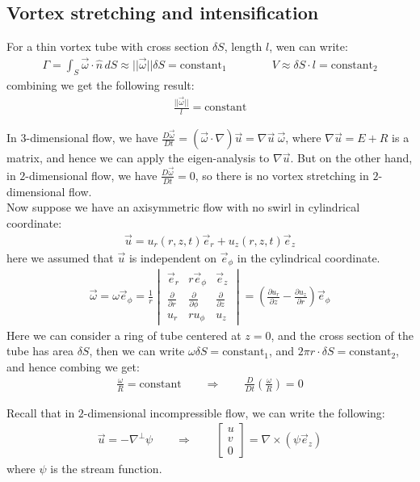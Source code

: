 \documentclass[11pt]{book}
\theoremstyle{break}
\theoremstyle{break}
\newcommand{\pd}{\partial}
\newcommand{\vmat}[1]{\begin{vmatrix} #1 \end{vmatrix}}
\newcommand{\bmat}[1]{\begin{bmatrix} #1 \end{bmatrix}}
\begin{document}
\subsection*{Vortex stretching and intensification}
For a thin vortex tube with cross section $\delta S$, length $l$, wen can write:
\begin{align*}
\Gamma = \int_S \vec{\omega}\cdot \hat{n}\, dS \approx ||\vec{\omega }|| \delta S = \text{constant}_1 \qquad \qquad V \approx \delta S \cdot l = \text{constant}_2
\end{align*}
combining we get the following result:
\begin{align*}
\frac{||\vec{\omega}||}{l} = \text{constant}
\end{align*}

In $3$-dimensional flow, we have $\frac{D\vec{\omega}}{Dt} = (\vec{\omega}\cdot \nabla) \vec{u} = \nabla \vec{u} \ \vec{\omega}$, where $\nabla \vec{u} = E+R$ is a matrix, and hence we can apply the eigen-analysis to $\nabla \vec{u}$. But on the other hand, in $2$-dimensional flow, we have $\frac{D\vec{\omega}}{Dt} = 0$, so there is no vortex stretching in $2$-dimensional flow. \\

Now suppose we have an axisymmetric flow with no swirl in cylindrical coordinate:
\begin{align*}
\vec{u} = u_r(r,z,t) \vec{e}_r + u_z(r, z,t)\vec{e}_z
\end{align*}
here we assumed that $\vec{u}$ is independent on $\vec{e}_\phi$ in the cylindrical coordinate.
\begin{align*}
\vec{\omega} = \omega \vec{e}_{\phi} = \frac{1}{r}\vmat{\vec{e}_r & r \vec{e}_{\phi} & \vec{e}_z \\ \frac{\partial}{\partial r} & \frac{\pd}{\pd \phi}& \frac{\pd }{\pd z} \\ u_r & ru_\phi & u_z } = \left( \frac{\pd u_r}{\pd z} - \frac{\pd u_z}{\pd r}\right) \vec{e}_\phi
\end{align*}
Here we can consider a ring of tube centered at $z=0$, and the cross section of the tube has area $\delta S$, then we can write $\omega \delta S = \text{constant}_1$, and $2\pi r \cdot \delta S = \text{constant}_2$, and hence combing we get:
\begin{align*}
\frac{\omega}{R} = \text{constant} \qquad \Rightarrow \qquad \frac{D}{Dt}\left( \frac{\omega}{R}\right) = 0
\end{align*}

Recall that in $2$-dimensional incompressible flow, we can write the following:
\begin{align*}
\vec{u} = -\nabla^{\perp}\psi \qquad\Rightarrow \qquad \bmat{u\\v\\0} = \nabla \times \left( \psi \vec{e}_z\right)
\end{align*}
where $\psi$ is the stream function.\\
\end{document}
